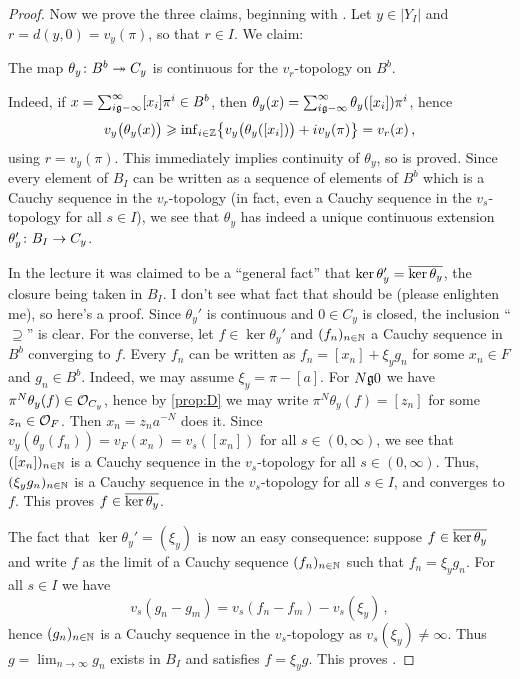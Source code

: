 \begin{proof}
	Now we prove the three claims, beginning with . Let $y\in |Y_I|$ and $r=d(y,0)=v_y(\pi)$, so that $r\in I$. We claim:
	\begin{alphanumerate}
		\item[\itememph{*}] The map $\theta_y\colon B^b\epimorphism C_y$ is continuous for the $v_r$-topology on $B^b$.
	\end{alphanumerate}
	Indeed, if $x=\sum_{i\gge -\infty}^\infty [x_i]\pi^i\in B^b$, then $\theta_y(x)=\sum_{i\gge -\infty}^\infty \theta_y([x_i])\pi^i$, hence
	\begin{equation*}
		v_y\big(\theta_y(x)\big)\geqslant \mathrm{inf}_{i\in\mathbb{Z}}\big\{v_y\big(\theta_y([x_i])\big)+iv_y(\pi)\big\}=v_r(x)\,,
	\end{equation*}
	using $r=v_y(\pi)$. This immediately implies continuity of $\theta_y$, so \itememph{*} is proved. Since every element of $B_I$ can be written as a sequence of elements of $B^b$ which is a Cauchy sequence in the $v_r$-topology (in fact, even a Cauchy sequence in the $v_s$-topology for all $s\in I$), we see that $\theta_y$ has indeed a unique continuous extension $\theta_y'\colon B_I\morphism C_y$.
	
	In the lecture it was claimed to be a \enquote{general fact} that $\ker \theta_y'=\ov{\ker\theta_y}$, the closure being taken in $B_I$. I don't see what fact that should be (please enlighten me), so here's a proof. Since $\theta_y'$ is continuous and $0\in C_y$ is closed, the inclusion \enquote{$\supseteq$} is clear. For the converse, let $f\in\ker\theta_y'$ and $(f_n)_{n\in\mathbb{N}}$ a Cauchy sequence in $B^b$ converging to $f$. Every $f_n$ can be written as $f_n=[x_n]+\xi_y g_n$ for some $x_n\in F$ and $g_n\in B^b$. Indeed, we may assume $\xi_y=\pi-[a]$. For $N\gge 0$ we have $\pi^N\theta_y(f)\in \mathcal{O}_{C_y}$, hence by \cref{prop:D} we may write $\pi^N\theta_y(f)=[z_n]$ for some $z_n\in \mathcal{O}_F$. Then $x_n=z_na^{-N}$ does it. Since $v_y(\theta_y(f_n))=v_F(x_n)=v_s([x_n])$ for all $s\in (0,\infty)$, we see that $([x_n])_{n\in\mathbb{N}}$ is a Cauchy sequence in the $v_s$-topology for all $s\in (0,\infty)$. Thus, $(\xi_yg_n)_{n\in\mathbb{N}}$ is a Cauchy sequence in the $v_s$-topology for all $s\in I$, and converges to $f$. This proves $f\in\ov{\ker\theta_y}$.
	
	The fact that $\ker\theta_y'=(\xi_y)$ is now an easy consequence: suppose $f\in\ov{\ker\theta_y}$ and write $f$ as the limit of a Cauchy sequence $(f_n)_{n\in\mathbb{N}}$ such that $f_n=\xi_yg_n$. For all $s\in I$ we have
	\begin{equation*}
		v_s(g_n-g_m)=v_s(f_n-f_m)-v_s(\xi_y)\,,
	\end{equation*}
	hence $(g_n)_{n\in\mathbb{N}}$ is a Cauchy sequence in the $v_s$-topology as $v_s(\xi_y)\neq \infty$. Thus $g=\lim_{n\to\infty}g_n$ exists in $B_I$ and satisfies $f=\xi_yg$. This proves .
	

\end{proof}
